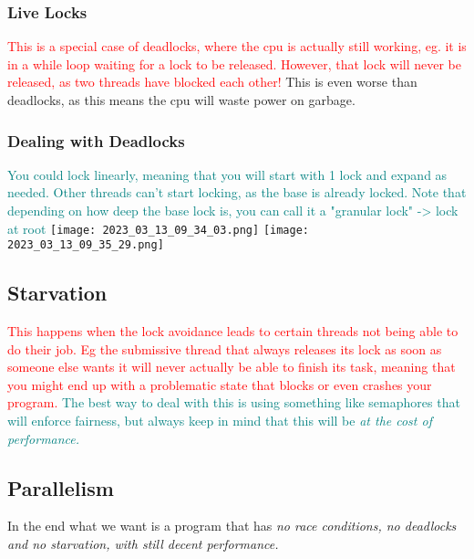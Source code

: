 \documentclass[main.tex,fontsize=8pt,paper=a4,paper=portrait,DIV=calc,]{scrartcl}
\begin{document}
\subsubsection{Live Locks}
\textcolor{red}{This is a special case of deadlocks, where the cpu is actually still working, eg. it is in a while loop waiting for a lock to be released.\newline
However, that lock will never be released, as two threads have blocked each other!}\newline
This is even worse than deadlocks, as this means the cpu will waste power on garbage.

\subsubsection{Dealing with Deadlocks}
\textcolor{teal}{You could lock linearly, meaning that you will start with 1 lock and expand as needed.\newline
Other threads can't start locking, as the base is already locked. \newline
Note that depending on how deep the base lock is, you can call it a "granular lock" -> lock at root}\newline
\texttt{[image: 2023\_03\_13\_09\_34\_03.png]}
\texttt{[image: 2023\_03\_13\_09\_35\_29.png]}

\subsection{Starvation}
\textcolor{red}{This happens when the lock avoidance leads to certain threads not being able to do their job. \newline
Eg the submissive thread that always releases its lock as soon as someone else wants it will never actually be able to finish its task, meaning that you might end up with a problematic state that blocks or even crashes your program.}\newline
\textcolor{teal}{The best way to deal with this is using something like semaphores that will enforce fairness, but always keep in mind that this will be \emph{at the cost of performance.}}

\subsection{Parallelism}
In the end what we want is a program that has \emph{no race conditions, no deadlocks and no starvation, with still decent performance.}
\end{document}
